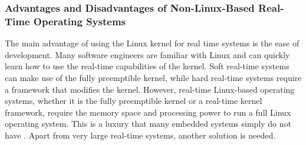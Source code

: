             \subsubsection{Advantages and Disadvantages of Non-Linux-Based Real-Time Operating Systems}
            \markboth{}{}
                The main advantage of using the Linux kernel for real time
                    systems is the ease of development.
                Many software engineers are familiar with Linux and can quickly
                    learn how to use the real-time capabilities of the kernel.
                Soft real-time systems can make use of the fully preemptible
                    kernel, while hard real-time systems require a framework
                    that modifies the kernel.
                However, real-time Linux-based operating systems, whether it is
                    the fully preemptible kernel or a real-time kernel
                    framework, require the memory space and processing power to
                    run a full Linux operating system.
                This is a luxury that many embedded systems simply do not have
                    \cite{rtos-overview}.
                Apart from very large real-time systems, another solution is
                    needed.
